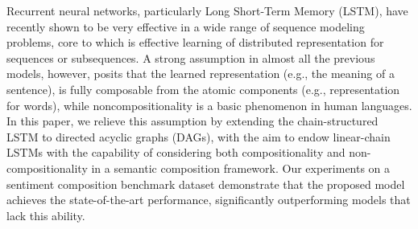 Recurrent neural networks, particularly Long Short-Term Memory (LSTM), have recently shown to be very effective in a wide range of sequence modeling problems, core to which is effective learning of distributed representation for sequences or subsequences. A strong assumption in almost all the previous models, however, posits that the learned representation (e.g., the meaning of a sentence), is fully composable from the atomic components (e.g., representation for words), while noncompositionality is a basic phenomenon in human languages. In this paper, we relieve this assumption by extending the chain-structured LSTM to directed acyclic graphs (DAGs), with the aim to endow linear-chain LSTMs with the capability of considering both compositionality and non-compositionality in a semantic composition framework. Our experiments on a sentiment composition benchmark dataset demonstrate that the proposed model achieves the state-of-the-art performance, significantly outperforming models that lack this ability.
